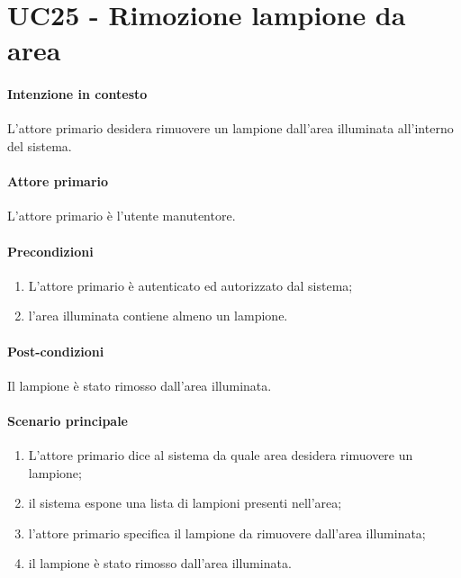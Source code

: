 \section{UC25 - Rimozione lampione da area}\label{uc:25}
\paragraph{Intenzione in contesto} L'attore primario desidera rimuovere un lampione dall'area illuminata all'interno del sistema.
\paragraph{Attore primario} L'attore primario è l'utente manutentore.
\paragraph{Precondizioni}  
\begin{enumerate}
    \item L'attore primario è autenticato ed autorizzato dal sistema;
    \item l'area illuminata contiene almeno un lampione.
\end{enumerate}
\paragraph{Post-condizioni} Il lampione è stato rimosso dall'area illuminata.
\paragraph{Scenario principale}
\begin{enumerate}
    \item L'attore primario dice al sistema da quale area desidera rimuovere un lampione;
    \item il sistema espone una lista di lampioni presenti nell'area;
    \item l'attore primario specifica il lampione da rimuovere dall'area illuminata;
    \item il lampione è stato rimosso dall'area illuminata.
\end{enumerate}